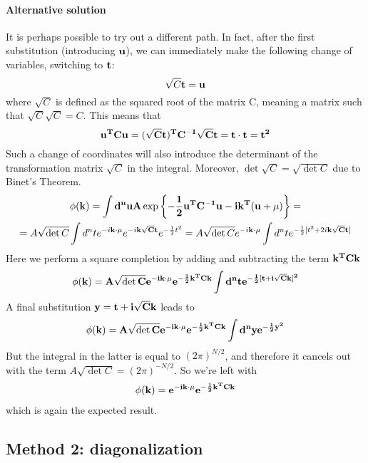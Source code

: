 \documentclass[a4paper,11pt,fleqn]{article}
\begin{document}
\paragraph{Alternative solution}
It is perhaps possible to try out a different path. In fact, after the first substitution (introducing $\bf{u}$), we can immediately
make the following change of variables, switching to $\bf{t}$:
\[
    \sqrt{C}\bf{t} = \bf{u}
\]
where $\sqrt{C}$ is defined as the squared root of the matrix C, meaning a matrix such that $\sqrt{C} \sqrt{C} = C$. This means that
\[
\bf{u}^T C \bf{u} = (\sqrt{C}\bf{t})^T C^{-1}\sqrt{C}\bf{t} = \bf{t} \cdot \bf{t} = t^2    
\]
Such a change of coordinates will also introduce the determinant of the transformation matrix $\sqrt{C}$ in the integral. Moreover,
$\det{\sqrt{C}}=\sqrt{\det{C}}$ due to Binet's Theorem. 
\begin{gather*}
    \phi(\bf{k})= \int d^n u A \exp{\left\{ -\frac{1}{2}\bf{u}^TC^{-1}\bf{u} - i\bf{k}^T(\bf{u}+\bf{\mu}) \right\}} = \\
    = A\sqrt{\det{C}}\int d^n t e^{-i\bf{k}\cdot \bf{\mu}}e^{-i\bf{k}\sqrt{C}\bf{t}}e^{-\frac{1}{2}t^2} = A\sqrt{\det{C}}e^{-i\bf{k}\cdot \bf{\mu}} \int d^n t e^{-\frac{1}{2}[t^2+2i\bf{k}\sqrt{C}\bf{t}]}
\end{gather*}
Here we perform a square completion by adding and subtracting the term $\bf{k}^TC\bf{k}$
\begin{gather*}
    \phi(\bf{k}) = A\sqrt{\det{C}} e^{-i\bf{k}\cdot \bf{\mu}}e^{-\frac{1}{2}\bf{k}^T C \bf{k}}\int d^nt e^{-\frac{1}{2}[\bf{t}+i\sqrt{C}\bf{k}]^2}
\end{gather*}
A final substitution $\bf{y}=\bf{t}+i\sqrt{C}\bf{k}$ leads to 
\begin{gather*}
    \phi(\bf{k}) = A\sqrt{\det{C}} e^{-i\bf{k}\cdot \bf{\mu}}e^{-\frac{1}{2}\bf{k}^T C \bf{k}}\int d^ny e^{-\frac{1}{2}y^2}
\end{gather*}
But the integral in the latter is equal to $(2\pi)^{N/2}$, and therefore it cancels out with the term
$A\sqrt{\det{C}}=(2\pi)^{-N/2}$. So we're left with 
\begin{gather*}
    \phi(\bf{k}) = e^{-i\bf{k}\cdot \bf{\mu}}e^{-\frac{1}{2}\bf{k}^T C \bf{k}}
\end{gather*}
which is again the expected result.

\subsection{Method 2: diagonalization}
\end{document}
